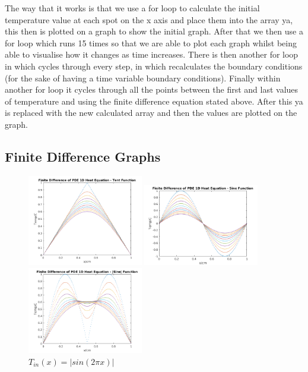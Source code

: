 \documentclass[11pt,a4paper]{article}
\begin{document}
The way that it works is that we use a for loop to calculate the initial temperature value at each spot on the x axis and place them into the array ya, this then is plotted on a graph to show the initial graph. After that we then use a for loop which runs 15 times so that we are able to plot each graph whilst being able to visualise how it changes as time increases. There is then another for loop in which cycles through every step, in which recalculates the boundary conditions (for the sake of having a time variable boundary conditions). Finally within another for loop it cycles through all the points between the first and last values of temperature and using the finite difference equation stated above. After this ya is replaced with the new calculated array and then the values are plotted on the graph.

\subsection{Finite Difference Graphs}

\begin{figure}
    \vspace{-13mm}
  		\includegraphics[width=0.45\textwidth]{Ex4_Figs/FiniteTent.png}
	\vspace{-4mm}
  	\caption{$T_{in}(x)= tent(x)$}
	\label{fig:ex4g1}
  		\includegraphics[width=0.45\textwidth]{Ex4_Figs/FiniteSine.png}
	\vspace{-4mm}
  	\caption{$T_{in}(x)= sin(2{\pi}x)$}
	\label{fig:ex4g2}
    \includegraphics[width=0.45\textwidth]{Ex4_Figs/FiniteSineabs.png}
    \vspace{-4mm}
    \caption{$T_{in}(x)= |sin(2{\pi}x)|$}
  	\label{fig:ex4g3}
\end{figure}
\end{document}
